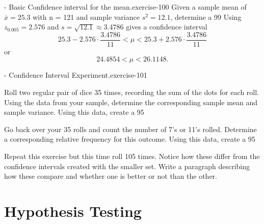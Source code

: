 \documentclass[10pt,]{book}
\numberwithin{equation}{section}
\newcommand{\lt}{<}
\begin{document}
 \begin{inlineexercise}{- Basic Confidence interval for the mean.}{exercise-100}%
\hypertarget{p-1435}{}%
Given a sample mean of \(\overline{x} = 25.3\) with n = 121 and sample variance \(s^2 = 12.1\), determine a 99%
\hypertarget{p-1436}{}%
Using \(z_{0.005} = 2.576\) and \(s = \sqrt{12.1} \approx 3.4786\) gives a confidence interval%
\begin{equation*}
25.3 - 2.576 \cdot \frac{3.4786}{11} \lt \mu \lt 25.3 + 2.576 \cdot \frac{3.4786}{11}
\end{equation*}
or%
\begin{equation*}
24.4854 \lt \mu \lt 26.1148.
\end{equation*}
%
%
\end{inlineexercise}
 \begin{inlineexercise}{- Confidence Interval Experiment.}{exercise-101}%
\hypertarget{p-1437}{}%
%
\end{inlineexercise}
 Roll two regular pair of dice 35 times, recording the sum of the dots for each roll.  Using the data from your sample, determine the corresponding sample mean and sample variance.  Using this data, create a 95%
\par
\hypertarget{p-1438}{}%
Go back over your 35 rolls and count the number of 7's or 11's rolled. Determine a corresponding relative frequency for this outcome. Using this data, create a 95%
\par
\hypertarget{p-1439}{}%
Repeat this exercise but this time roll 105 times.  Notice how these differ from the confidence intervals created with the smaller set.  Write a paragraph describing how these compare and whether one is better or not than the other.%
%
%
\typeout{************************************************}
\typeout{************************************************}
%
\chapter[{Hypothesis Testing}]{Hypothesis Testing}\label{HypothesisTesting}
%
%
\typeout{************************************************}
\typeout{************************************************}
%
\end{document}
